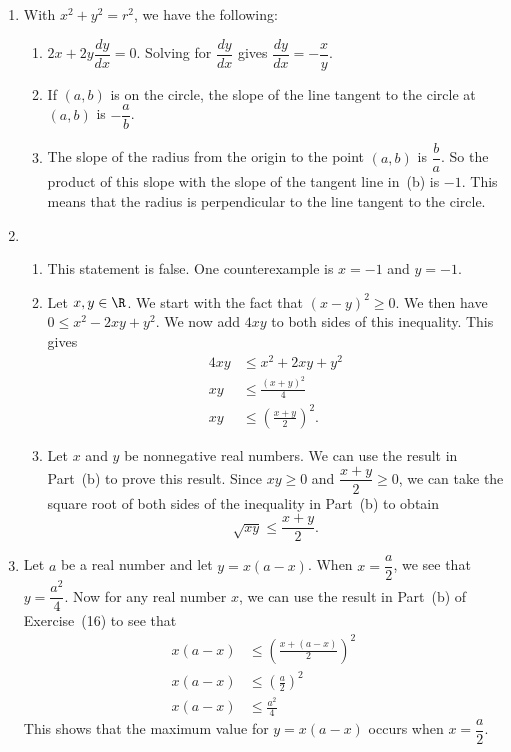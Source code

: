\begin{enumerate}
\item With $x^2 + y^2 = r^2$, we have the following:
\begin{enumerate}
\item $2x + 2y \dfrac{dy}{dx} = 0$.  Solving for $\dfrac{dy}{dx}$ gives 
$\dfrac{dy}{dx} = -\dfrac{x}{y}$.

\item If $(a, b)$ is on the circle, the slope of the line tangent to the circle at $(a, b)$ is 
$-\dfrac{a}{b}$.

\item The slope of the radius from the origin to the point $(a, b)$ is $\dfrac{b}{a}$.  So the product of this slope with the slope of the tangent line in~(b) is $-1$.  This means that the radius is perpendicular to the line tangent to the circle.
\end{enumerate}


\item \begin{enumerate}
\item This statement is false.  One counterexample is $x = -1$ and $y = -1$.

\item Let $x, y \in \R$.  We start with the fact that $(x - y)^2 \geq 0$.  We then have 
$0 \leq x^2 - 2xy + y^2$.  We now add $4xy$ to both sides of this inequality.  This gives
\begin{align*}
4xy &\leq x^2 + 2xy + y^2 \\
 xy &\leq \frac{(x + y)^2}{4} \\
 xy &\leq \left( \frac{x + y}{2} \right)^2.
\end{align*}

\item Let $x$ and $y$ be nonnegative real numbers.  We can use the result in Part~(b) to prove this result.  Since $xy \geq 0$ and $\dfrac{x+y}{2} \geq 0$, we can take the square root of both sides of the inequality in Part~(b) to obtain
\[
\sqrt{xy} \leq \frac{x + y}{2}.
\]
\end{enumerate}


\item Let $a$ be a real number and let $y = x(a - x)$.  When $x = \dfrac{a}{2}$, we see that $y = \dfrac{a^2}{4}$.  Now for any real number $x$, we can use the result in Part~(b) of Exercise~(16) to see that
\begin{align*}
x(a - x) &\leq \left( \frac{x + (a - x)}{2} \right)^2 \\
x(a - x) &\leq \left( \frac{a}{2} \right)^2 \\
x(a - x) &\leq \frac{a^2}{4}
\end{align*}
This shows that the maximum value for $y = x(a - x)$ occurs when $x = \dfrac{a}{2}$.



\end{enumerate}
